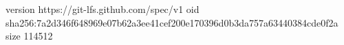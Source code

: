 version https://git-lfs.github.com/spec/v1
oid sha256:7a2d346f648969e07b62a3ee41cef200e170396d0b3da757a63440384cde0f2a
size 114512
